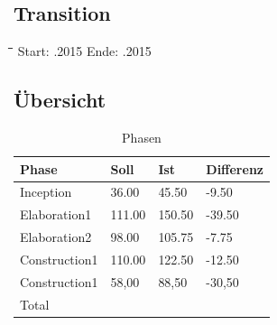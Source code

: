 \subsection{Transition}
\begin{tabbing}[H]
    \hspace*{3cm}\=\hspace*{5cm}\=\hspace*{3cm}\=\hspace*{3cm}\= \kill
    Start: .2015 \> Ende: .2015 \\
\end{tabbing}

\subsection{Übersicht}
\begin{table}[H]
\centering
    \begin{tabular}{|p{5cm}|p{2cm}|p{2cm}|p{2cm}|}
    \hline    
    \rowcolor{lightblue}
	Phase & Soll & Ist & Differenz \\ \hline
	Inception & 36.00 &	45.50 &	-9.50 \\ \hline
	Elaboration1 & 111.00 & 150.50	& -39.50 \\ \hline
	Elaboration2 & 98.00 & 105.75 & -7.75 \\ \hline
	Construction1 & 110.00 & 122.50 & -12.50 \\ \hline
	Construction1 & 58,00 & 88,50 & -30,50 \\ \hline
	\rowcolor{lightblue}
	Total & & & \\ \hline
    \end{tabular}
    \caption[Phasen]{Phasen}
\end{table}

\newpage